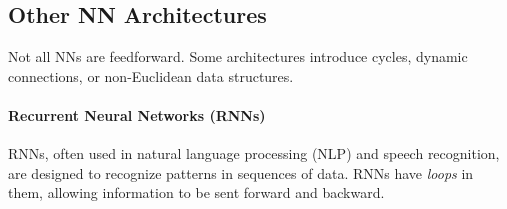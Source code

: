 \documentclass[oneside,11pt,dvipsnames]{book}
\numberwithin{equation}{section}
\theoremstyle{definition}
\theoremstyle{remark}
\begin{document}



\subsection{Other NN Architectures}

Not all NNs are feedforward. Some architectures introduce cycles, dynamic connections, or non-Euclidean data structures.

\paragraph{Recurrent Neural Networks (RNNs)} RNNs, often used in natural language processing (NLP) and speech recognition, are designed to recognize patterns in sequences of data. RNNs have \emph{loops} in them, allowing information to be sent forward and backward.
\end{document}
